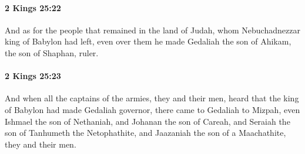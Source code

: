 		\paragraph{2 Kings 25:22} %
			\label{2KINGS-25-22}

			And as for the people that remained in the land of Judah, whom Nebuchadnezzar king of Babylon had left, even over them he made Gedaliah the son of Ahikam, the son of Shaphan, ruler.


		\paragraph{2 Kings 25:23} %
			\label{2KINGS-25-23}

			And when all the captains of the armies, they and their men, heard that the king of Babylon had made Gedaliah governor, there came to Gedaliah to Mizpah, even Ishmael the son of Nethaniah, and Johanan the son of Careah, and Seraiah the son of Tanhumeth the Netophathite, and Jaazaniah the son of a Maachathite, they and their men.

